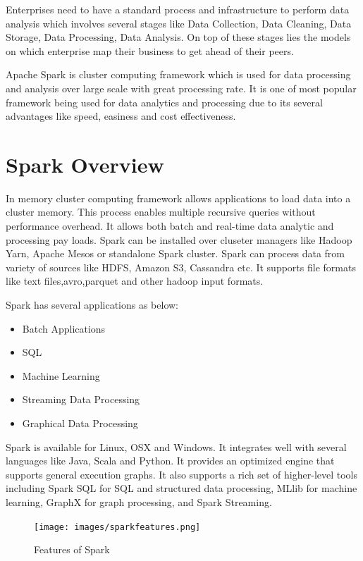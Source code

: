 Enterprises need to have a standard process and infrastructure to perform data
analysis which involves several stages like Data Collection, Data Cleaning,
Data Storage, Data Processing, Data Analysis. On top of these stages lies the
models on which enterprise map their business to get ahead of their peers.


Apache Spark is cluster computing framework which is used for data processing
and analysis over large scale with great processing rate. It is one of most
popular framework being used for data analytics and processing due to its
several advantages like speed, easiness and cost effectiveness.


\section{Spark Overview}

In memory cluster computing framework allows applications to load data into a
cluster memory. This process enables multiple recursive queries without
performance overhead. It allows both batch and real-time data analytic and
processing pay loads. Spark can be installed over cluseter managers like
Hadoop Yarn, Apache Mesos or standalone Spark cluster. Spark can process data
from variety of sources like HDFS, Amazon S3, Cassandra etc. It supports file
formats like text files,avro,parquet and other hadoop input formats.

Spark has several applications as below:

\begin{itemize}
   \item Batch Applications 
   \item SQL
   \item Machine Learning
   \item Streaming Data Processing
   \item Graphical Data Processing  
\end{itemize}

Spark is available for Linux, OSX and Windows. It integrates well with several
languages like Java, Scala and Python. It provides an optimized engine that
supports general execution graphs. It also supports a rich set of higher-level
tools including Spark SQL for SQL and structured data processing, MLlib for
machine learning, GraphX for graph processing, and Spark Streaming.


\begin{figure}[!ht]
  \centering\texttt{[image: images/sparkfeatures.png]}
  \caption{Features
  of Spark~\cite{hid-sp18-522-sparkfeatures-image} }\label{f:fig1}
\end{figure}


